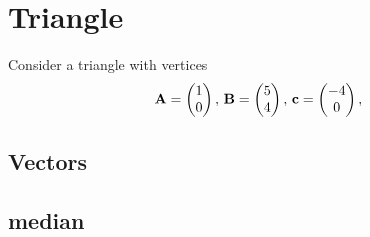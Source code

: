 \documentclass[11pt]{book}
\begin{document}
\frontmatter
\tableofcontents
\setcounter{page}{1}
\mainmatter
\chapter{Triangle}
Consider a triangle with vertices
\begin{align}
\label{eq:tri-pts}
\vec{A}=\myvec{1 \\ 0},\,
\vec{B}=\myvec{5\\4},\,
	\vec{c}=\myvec{-4\\0},\,
\end{align}

\section{Vectors}
\section{median}
\end{document}
